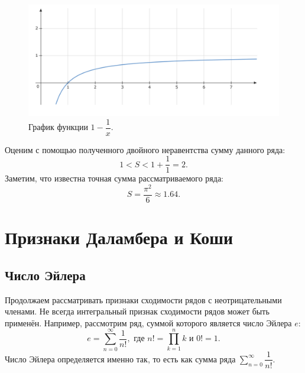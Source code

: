 \documentclass[12pt]{article}
\begin{document}
\begin{figure}[hbt]
    \centering
    \includegraphics[width = 1\textwidth]{Лекция 2/fig9.png}
    \caption{График функции $1 - \dfrac{1}{x}$.}
    \label{fig:9}
\end{figure}
Оценим с помощью полученного двойного неравентства сумму данного ряда:
\begin{equation}
    1 < S < 1 + \dfrac{1}{1} = 2.
\end{equation}
Заметим, что известна точная сумма рассматриваемого ряда:
\begin{equation}
    S = \dfrac{\pi^2}{6} \approx 1.64.
\end{equation}
\section{Признаки Даламбера и Коши}
\subsection{Число Эйлера}
Продолжаем рассматривать признаки сходимости рядов с неотрицательными членами. Не всегда интегральный признак сходимости рядов может быть применён. Например, рассмотрим ряд, суммой которого является число Эйлера $e$:
\begin{equation}
    e = \sum\limits_{n=0}^\infty \dfrac{1}{n!},\text{ где } n! = \prod\limits_{k=1}^n k\text{ и }0! = 1.
\end{equation}
Число Эйлера определяется именно так, то есть как сумма ряда $\sum\limits_{n=0}^\infty \dfrac{1}{n!}$.
\end{document}
